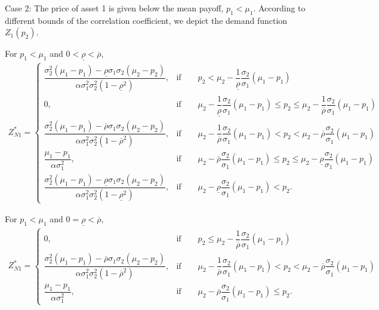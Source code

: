 \documentclass[10pt]{article}
\begin{document}
Case 2: The price of asset 1 is given below the mean payoff, $ p_1 < \mu_1 $. According to different bounds of the correlation coefficient, we depict the demand function $ Z_1 (p_2) $.

For $ p_1 < \mu_1 $ and $ 0 < \underline{\rho} < \overline{\rho} $,
{\footnotesize \begin{eqnarray}
Z_{N 1}^* = \left\{ \begin{matrix}
\dfrac{\sigma_2^2 (\mu_1 - p_1) - \underline{\rho} \sigma_1 \sigma_2 (\mu_2 - p_2)}{\alpha \sigma_1^2 \sigma_2^2 (1 - \underline{\rho}^2)}, & \text{if} \qquad p_2 < \mu_2 - \dfrac1{\underline{\rho}} \dfrac{\sigma_2}{\sigma_1} (\mu_1 - p_1) \\
0, & \text{if} \qquad \mu_2 - \dfrac1{\underline{\rho}} \dfrac{\sigma_2}{\sigma_1} (\mu_1 - p_1) \leqslant p_2 \leqslant \mu_2 - \dfrac1{\overline{\rho}} \dfrac{\sigma_2}{\sigma_1} (\mu_1 - p_1) \\
\dfrac{\sigma_2^2 (\mu_1 - p_1) - \overline{\rho} \sigma_1 \sigma_2 (\mu_2 - p_2)}{\alpha \sigma_1^2 \sigma_2^2 (1 - \overline{\rho}^2)}, & \text{if} \qquad \mu_2 - \dfrac1{\overline{\rho}} \dfrac{\sigma_2}{\sigma_1} (\mu_1 - p_1) < p_2 < \mu_2 - \overline{\rho} \dfrac{\sigma_2}{\sigma_1} (\mu_1 - p_1) \\
\dfrac{\mu_1 - p_1}{\alpha \sigma_1^2}, & \text{if} \qquad \mu_2 - \overline{\rho} \dfrac{\sigma_2}{\sigma_1} (\mu_1 - p_1) \leqslant p_2 \leqslant \mu_2 - \underline{\rho} \dfrac{\sigma_2}{\sigma_1} (\mu_1 - p_1) \\
\dfrac{\sigma_2^2 (\mu_1 - p_1) - \underline{\rho} \sigma_1 \sigma_2 (\mu_2 - p_2)}{\alpha \sigma_1^2 \sigma_2^2 (1 - \underline{\rho}^2)}, & \text{if} \qquad \mu_2 - \underline{\rho} \dfrac{\sigma_2}{\sigma_1} (\mu_1 - p_1) < p_2.
\end{matrix} \right.
\end{eqnarray}}

For $ p_1 < \mu_1 $ and $ 0 = \underline{\rho} < \overline{\rho} $,
{\footnotesize \begin{eqnarray}
Z_{N 1}^* = \left\{ \begin{matrix}
0, & \text{if} \qquad p_2 \leqslant \mu_2 - \dfrac1{\overline{\rho}} \dfrac{\sigma_2}{\sigma_1} (\mu_1 - p_1) \\
\dfrac{\sigma_2^2 (\mu_1 - p_1) - \overline{\rho} \sigma_1 \sigma_2 (\mu_2 - p_2)}{\alpha \sigma_1^2 \sigma_2^2 (1 - \overline{\rho}^2)}, & \text{if} \qquad \mu_2 - \dfrac1{\overline{\rho}} \dfrac{\sigma_2}{\sigma_1} (\mu_1 - p_1) < p_2 < \mu_2 - \overline{\rho} \dfrac{\sigma_2}{\sigma_1} (\mu_1 - p_1) \\
\dfrac{\mu_1 - p_1}{\alpha \sigma_1^2}, & \text{if} \qquad \mu_2 - \overline{\rho} \dfrac{\sigma_2}{\sigma_1} (\mu_1 - p_1) \leqslant p_2.
\end{matrix} \right.
\end{eqnarray}}
\end{document}
